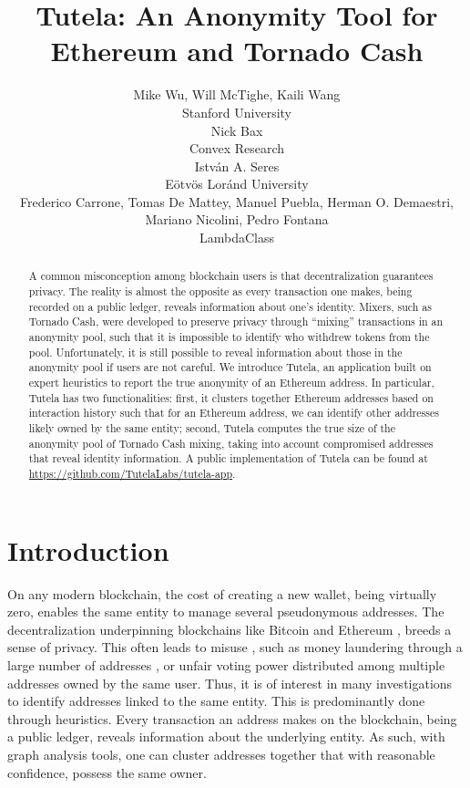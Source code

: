 \documentclass[11pt,a4paper]{article}
\title{Tutela: An Anonymity Tool for Ethereum and Tornado Cash}
\author{
  \small{Mike Wu, Will McTighe, Kaili Wang}\\
  \small{Stanford University} \\ \And
  \small{Nick Bax} \\
  \small{Convex Research} \\ \And
  \small{Istv\'{a}n A. Seres} \\
  \small{E\"{o}tv\"{o}s Lor\'{a}nd University} \\ \AND
  \small{Frederico Carrone, Tomas De Mattey, Manuel Puebla, Herman O. Demaestri, Mariano Nicolini, Pedro Fontana} \\
  \small{LambdaClass} \\}
\date{}
\begin{document}
\maketitle
\begin{abstract}
A common misconception among blockchain users is that decentralization guarantees privacy. The reality is almost the opposite as every transaction one makes, being recorded on a public ledger, reveals information about one's identity.
Mixers, such as Tornado Cash, were developed to preserve privacy through ``mixing'' transactions in an anonymity pool, such that it is impossible to identify who withdrew tokens from the pool. Unfortunately, it is still possible to reveal information about those in the anonymity pool if users are not careful.
We introduce Tutela, an application built on expert heuristics to report the true anonymity of an Ethereum address.
In particular, Tutela has two functionalities: first, it clusters together Ethereum addresses based on interaction history such that for an Ethereum address, we can identify other addresses likely owned by the same entity; second, Tutela computes the true size of the anonymity pool of Tornado Cash mixing, taking into account compromised addresses that reveal identity information. A public implementation of Tutela can be found at \url{https://github.com/TutelaLabs/tutela-app}.
\end{abstract}

\section{Introduction}

On any modern blockchain, the cost of creating a new wallet, being virtually zero, enables the same entity to manage several pseudonymous addresses. The decentralization underpinning blockchains like Bitcoin \citep{nakamoto2008bitcoin} and Ethereum \citep{buterin2013ethereum}, breeds a sense of privacy. This often leads to misuse \citep{christin2013traveling}, such as money laundering through a large number of addresses \citep{moser2013inquiry}, or unfair voting power distributed among multiple addresses owned by the same user. Thus, it is of interest in many investigations to identify addresses linked to the same entity. This is predominantly done through heuristics. Every transaction an address makes on the blockchain, being a public ledger, reveals information about the underlying entity. As such, with graph analysis tools, one can cluster addresses together that with reasonable confidence, possess the same owner.
\end{document}
